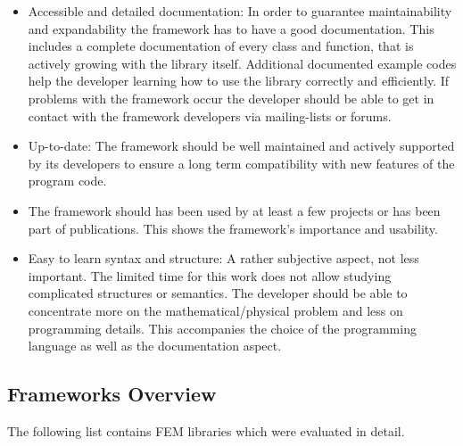 \begin{itemize}
  \item Accessible and detailed documentation: In order to guarantee maintainability and expandability the framework has to have a good documentation. This includes a complete documentation of every class and function, that is actively growing with the library itself. Additional documented example codes help the developer learning how to use the library correctly and efficiently. If problems with the framework occur the developer should be able to get in contact with the framework developers via mailing-lists or forums.
 
  \item Up-to-date: The framework should be well maintained and actively supported by its developers to ensure a long term compatibility with new features of the program code.
 
  \item The framework should has been used by at least a few projects or has been part of publications. This shows the framework's importance and usability.
 
  \item Easy to learn syntax and structure: A rather subjective aspect, not less important. The limited time for this work does not allow studying complicated structures or semantics. The developer should be able to concentrate more on the mathematical/physical problem and less on programming details. This accompanies the choice of the programming language as well as the documentation aspect.
 \end{itemize}
 
 
 
 \subsection{Frameworks Overview}
 The following list contains FEM libraries which were evaluated in detail.
  
  
